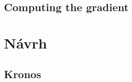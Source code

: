 \documentclass[10pt,a4paper]{article}
\begin{document}
\subsection{Computing the gradient}





\section{Návrh}

\subsection{Kronos}
\end{document}
